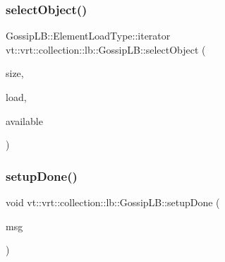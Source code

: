 \mbox{\label{structvt_1_1vrt_1_1collection_1_1lb_1_1_gossip_l_b_adafa0d7c3295e095149f48c3027b3173}} 
\subsubsection{\texorpdfstring{select\+Object()}{selectObject()}}
{\footnotesize\ttfamily Gossip\+L\+B\+::\+Element\+Load\+Type\+::iterator vt\+::vrt\+::collection\+::lb\+::\+Gossip\+L\+B\+::select\+Object (\begin{DoxyParamCaption}\item[{\hyperlink{structvt_1_1vrt_1_1collection_1_1lb_1_1_base_l_b_a215e22b9f12678303f49615ae3be05cc}{Load\+Type}}]{size,  }\item[{\hyperlink{structvt_1_1vrt_1_1collection_1_1lb_1_1_base_l_b_aa286d31a0820a8fc9218ccb858368fca}{Element\+Load\+Type} \&}]{load,  }\item[{std\+::set$<$ \hyperlink{structvt_1_1vrt_1_1collection_1_1lb_1_1_base_l_b_a15a2f756b59c8c2437985206b32aa403}{Obj\+I\+D\+Type} $>$ const \&}]{available }\end{DoxyParamCaption})\hspace{0.3cm}{\ttfamily [protected]}}

\mbox{\label{structvt_1_1vrt_1_1collection_1_1lb_1_1_gossip_l_b_a8ac1a82bee0f81996362076df16c2379}} 
\subsubsection{\texorpdfstring{setup\+Done()}{setupDone()}}
{\footnotesize\ttfamily void vt\+::vrt\+::collection\+::lb\+::\+Gossip\+L\+B\+::setup\+Done (\begin{DoxyParamCaption}\item[{\hyperlink{structvt_1_1vrt_1_1collection_1_1lb_1_1_gossip_l_b_ad251f887a319f433771b084187ef6089}{Reduce\+Msg\+Type} $\ast$}]{msg }\end{DoxyParamCaption})\hspace{0.3cm}{\ttfamily [protected]}}

